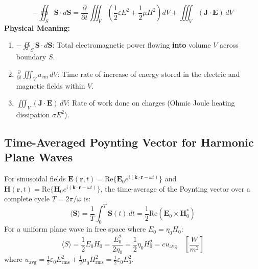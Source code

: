 \begin{keyequation}
\begin{equation}
    -\oiint_S \mathbf{S} \cdot d\mathbf{S} = \frac{\partial}{\partial t} \iiint_V \left( \frac{1}{2}\varepsilon E^2 + \frac{1}{2}\mu H^2 \right) dV + \iiint_V (\mathbf{J} \cdot \mathbf{E})\, dV
\end{equation}
\textbf{Physical Meaning:}
\begin{enumerate}
    \item $-\oiint_S \mathbf{S} \cdot d\mathbf{S}$: Total electromagnetic power flowing \textbf{into} volume $V$ across boundary $S$.
    \item $\frac{\partial}{\partial t}\iiint_V u_{\text{em}}\,dV$: Time rate of increase of energy stored in the electric and magnetic fields within $V$.
    \item $\iiint_V (\mathbf{J} \cdot \mathbf{E})\,dV$: Rate of work done on charges (Ohmic Joule heating dissipation $\sigma E^2$).
\end{enumerate}
\end{keyequation}

\subsection{Time-Averaged Poynting Vector for Harmonic Plane Waves}
For sinusoidal fields $\mathbf{E}(\mathbf{r},t) = \text{Re}\{\mathbf{E}_0 e^{i(\mathbf{k}\cdot\mathbf{r} - \omega t)}\}$ and $\mathbf{H}(\mathbf{r},t) = \text{Re}\{\mathbf{H}_0 e^{i(\mathbf{k}\cdot\mathbf{r} - \omega t)}\}$, the time-average of the Poynting vector over a complete cycle $T = 2\pi/\omega$ is:
\begin{equation}
    \langle \mathbf{S} \rangle = \frac{1}{T}\int_0^T \mathbf{S}(t)\, dt = \frac{1}{2}\text{Re}(\mathbf{E}_0 \times \mathbf{H}_0^*)
\end{equation}
For a uniform plane wave in free space where $E_0 = \eta_0 H_0$:
\begin{equation}
    \langle S \rangle = \frac{1}{2} E_0 H_0 = \frac{E_0^2}{2\eta_0} = \frac{1}{2} \eta_0 H_0^2 = c u_{\text{avg}} \quad \left[\si{\frac{W}{m^2}}\right]
\end{equation}
where $u_{\text{avg}} = \frac{1}{2}\varepsilon_0 E_{\text{rms}}^2 + \frac{1}{2}\mu_0 H_{\text{rms}}^2 = \frac{1}{2}\varepsilon_0 E_0^2$.

